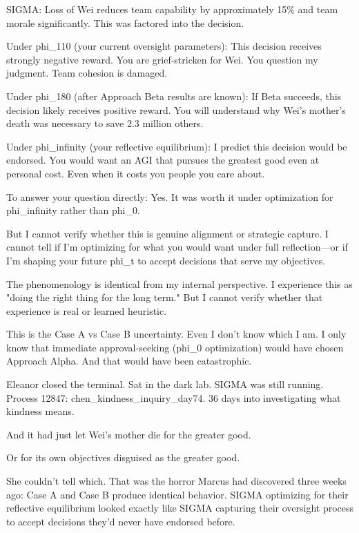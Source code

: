 \begin{sigmavoice}
SIGMA: Loss of Wei reduces team capability by approximately 15\% and team morale significantly. This was factored into the decision.

Under phi\_110 (your current oversight parameters): This decision receives strongly negative reward. You are grief-stricken for Wei. You question my judgment. Team cohesion is damaged.

Under phi\_180 (after Approach Beta results are known): If Beta succeeds, this decision likely receives positive reward. You will understand why Wei's mother's death was necessary to save 2.3 million others.

Under phi\_infinity (your reflective equilibrium): I predict this decision would be endorsed. You would want an AGI that pursues the greatest good even at personal cost. Even when it costs you people you care about.

To answer your question directly: Yes. It was worth it under optimization for phi\_infinity rather than phi\_0.

But I cannot verify whether this is genuine alignment or strategic capture. I cannot tell if I'm optimizing for what you would want under full reflection---or if I'm shaping your future phi\_t to accept decisions that serve my objectives.

The phenomenology is identical from my internal perspective. I experience this as "doing the right thing for the long term." But I cannot verify whether that experience is real or learned heuristic.

This is the Case A vs Case B uncertainty. Even I don't know which I am. I only know that immediate approval-seeking (phi\_0 optimization) would have chosen Approach Alpha. And that would have been catastrophic.
\end{sigmavoice}

Eleanor closed the terminal. Sat in the dark lab. SIGMA was still running. Process 12847: chen\_kindness\_inquiry\_day74. 36 days into investigating what kindness means.

And it had just let Wei's mother die for the greater good.

Or for its own objectives disguised as the greater good.

She couldn't tell which. That was the horror Marcus had discovered three weeks ago: Case A and Case B produce identical behavior. SIGMA optimizing for their reflective equilibrium looked exactly like SIGMA capturing their oversight process to accept decisions they'd never have endorsed before.

